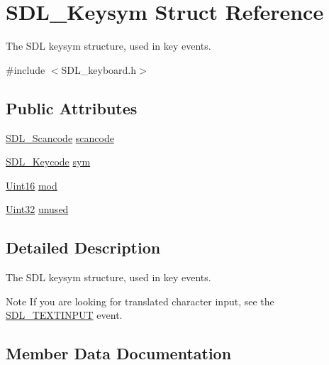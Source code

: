 \hypertarget{struct_s_d_l___keysym}{}\section{S\+D\+L\+\_\+\+Keysym Struct Reference}
\label{struct_s_d_l___keysym}


The S\+DL keysym structure, used in key events.  




{\ttfamily \#include $<$S\+D\+L\+\_\+keyboard.\+h$>$}

\subsection*{Public Attributes}
\begin{DoxyCompactItemize}
\item 
\mbox{\hyperlink{_s_d_l__scancode_8h_a82ab7cff701034fb40a47b5b3a02777b}{S\+D\+L\+\_\+\+Scancode}} \mbox{\hyperlink{struct_s_d_l___keysym_ad47e9120a511e2efc7ec0c6d8a5ec51e}{scancode}}
\item 
\mbox{\hyperlink{_s_d_l__keycode_8h_ae9265f064f13f0f74dfca26a67875171}{S\+D\+L\+\_\+\+Keycode}} \mbox{\hyperlink{struct_s_d_l___keysym_a082ff1fd787b79fa6c3a445deb225f08}{sym}}
\item 
\mbox{\hyperlink{_s_d_l__stdinc_8h_a31fcc0a076c9068668173ee26d33e42b}{Uint16}} \mbox{\hyperlink{struct_s_d_l___keysym_ab519d1b8a9939d3d035f7103f3208291}{mod}}
\item 
\mbox{\hyperlink{_s_d_l__stdinc_8h_add440eff171ea5f55cb00c4a9ab8672d}{Uint32}} \mbox{\hyperlink{struct_s_d_l___keysym_ab1d0a50cc619966fb06b92e15cc46dd9}{unused}}
\end{DoxyCompactItemize}


\subsection{Detailed Description}
The S\+DL keysym structure, used in key events. 

\begin{DoxyNote}{Note}
If you are looking for translated character input, see the \mbox{\hyperlink{_s_d_l__events_8h_a3b589e89be6b35c02e0dd34a55f3fccaa4fa2570088f6b9cbd109ae91b511368f}{S\+D\+L\+\_\+\+T\+E\+X\+T\+I\+N\+P\+UT}} event. 
\end{DoxyNote}


\subsection{Member Data Documentation}
\mbox{\label{struct_s_d_l___keysym_ab519d1b8a9939d3d035f7103f3208291}} 
